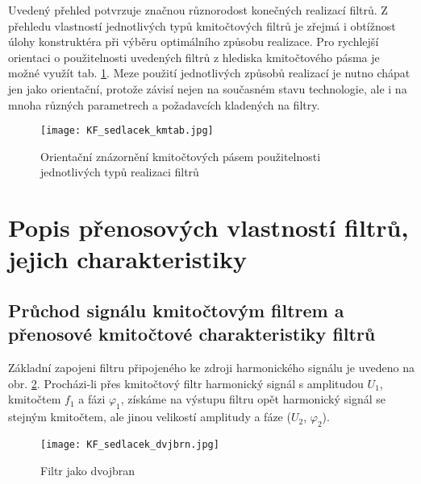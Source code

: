         Uvedený přehled potvrzuje značnou různorodost konečných realizací filtrů. Z přehledu
        vlastností jednotlivých typů kmitočtových filtrů je zřejmá i obtížnost úlohy konstruktéra
        při výběru optimálního způsobu realizace. Pro rychlejší orientaci o použitelnosti
        uvedených filtrů z hlediska kmitočtového pásma je možné využít tab.
        \ref{aes:fig_KF_sedlacek_kmtab}. Meze použití jednotlivých způsobů realizací je nutno chápat
        jen jako orientační, protože závisí nejen na současném stavu technologie, ale i na mnoha
        různých parametrech a požadavcích kladených na filtry.

        \begin{figure}[ht!]
          \centering
          \texttt{[image: KF\_sedlacek\_kmtab.jpg]}
          \caption[Orientační znázornění kmitočtových pásem použitelnosti jednotlivých typů
                   realizaci filtrů]{Orientační znázornění kmitočtových pásem použitelnosti
                   jednotlivých typů realizaci filtrů}
          \label{aes:fig_KF_sedlacek_kmtab}    
        \end{figure} 
  
  \section{Popis přenosových vlastností filtrů, jejich charakteristiky}
    \subsection{Průchod signálu kmitočtovým filtrem a přenosové kmitočtové charakteristiky filtrů}
      Základní zapojeni filtru připojeného ke zdroji harmonického signálu je uvedeno na obr.
      \ref{aes:fig_KF_sedlacek_dvjbrn}. Procházi-li přes kmitočtový filtr harmonický signál s
      amplitudou \(U_1\), kmitočtem \(f_1\) a fázi \(\varphi_1\), získáme na výstupu filtru opět
      harmonický signál se stejným kmitočtem, ale jinou velikostí amplitudy a fáze (\(U_2\),
      \(\varphi_2\)).
  
      \begin{figure}[ht!]
        \centering
        \texttt{[image: KF\_sedlacek\_dvjbrn.jpg]}
        \caption[Filtr jako dvojbran]{Filtr jako dvojbran}
        \label{aes:fig_KF_sedlacek_dvjbrn}    
      \end{figure}
      
